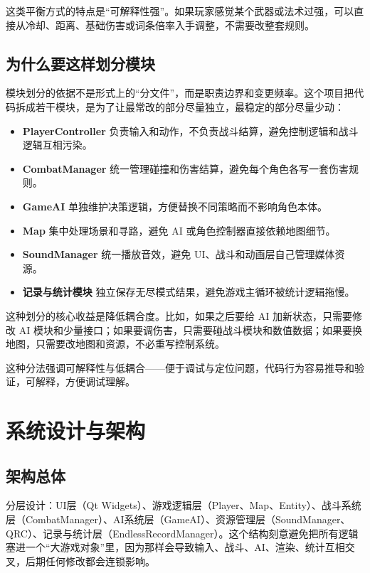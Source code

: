 ﻿\documentclass[utf8]{ctexart}
\begin{document}
这类平衡方式的特点是“可解释性强”。如果玩家感觉某个武器或法术过强，可以直接从冷却、距离、基础伤害或词条倍率入手调整，不需要改整套规则。

\subsection{为什么要这样划分模块}

模块划分的依据不是形式上的“分文件”，而是职责边界和变更频率。这个项目把代码拆成若干模块，是为了让最常改的部分尽量独立，最稳定的部分尽量少动：

\begin{itemize}
  \item \textbf{PlayerController} 负责输入和动作，不负责战斗结算，避免控制逻辑和战斗逻辑互相污染。
  \item \textbf{CombatManager} 统一管理碰撞和伤害结算，避免每个角色各写一套伤害规则。
  \item \textbf{GameAI} 单独维护决策逻辑，方便替换不同策略而不影响角色本体。
  \item \textbf{Map} 集中处理场景和寻路，避免 AI 或角色控制器直接依赖地图细节。
  \item \textbf{SoundManager} 统一播放音效，避免 UI、战斗和动画层自己管理媒体资源。
  \item \textbf{记录与统计模块} 独立保存无尽模式结果，避免游戏主循环被统计逻辑拖慢。
\end{itemize}

这种划分的核心收益是降低耦合度。比如，如果之后要给 AI 加新状态，只需要修改 AI 模块和少量接口；如果要调伤害，只需要碰战斗模块和数值数据；如果要换地图，只需要改地图和资源，不必重写控制系统。

这种分法强调可解释性与低耦合——便于调试与定位问题，代码行为容易推导和验证，可解释，方便调试理解。

\section{系统设计与架构}

\subsection{架构总体}

分层设计：UI层（Qt Widgets）、游戏逻辑层（Player、Map、Entity）、战斗系统层（CombatManager）、AI系统层（GameAI）、资源管理层（SoundManager、QRC）、记录与统计层（EndlessRecordManager）。这个结构刻意避免把所有逻辑塞进一个“大游戏对象”里，因为那样会导致输入、战斗、AI、渲染、统计互相交叉，后期任何修改都会连锁影响。
\end{document}
